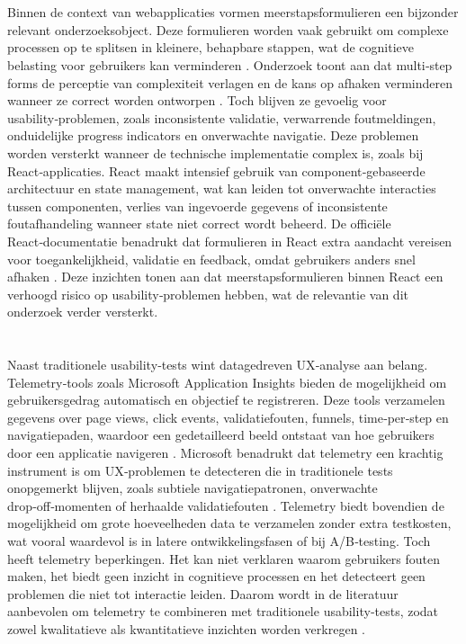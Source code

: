 \section{} 
Binnen de context van webapplicaties vormen meerstapsformulieren een bijzonder relevant onderzoeksobject. Deze formulieren worden vaak gebruikt om complexe processen op te splitsen in kleinere, behapbare stappen, wat de cognitieve belasting voor gebruikers kan verminderen \autocite{Sweller2011}. Onderzoek toont aan dat multi‑step forms de perceptie van complexiteit verlagen en de kans op afhaken verminderen wanneer ze correct worden ontworpen \autocite{BargasAvila2019}. Toch blijven ze gevoelig voor usability‑problemen, zoals inconsistente validatie, verwarrende foutmeldingen, onduidelijke progress indicators en onverwachte navigatie. Deze problemen worden versterkt wanneer de technische implementatie complex is, zoals bij React‑applicaties. React maakt intensief gebruik van component‑gebaseerde architectuur en state management, wat kan leiden tot onverwachte interacties tussen componenten, verlies van ingevoerde gegevens of inconsistente foutafhandeling wanneer state niet correct wordt beheerd. De officiële React‑documentatie benadrukt dat formulieren in React extra aandacht vereisen voor toegankelijkheid, validatie en feedback, omdat gebruikers anders snel afhaken \autocite{ReactForms2024}. Deze inzichten tonen aan dat meerstapsformulieren binnen React een verhoogd risico op usability‑problemen hebben, wat de relevantie van dit onderzoek verder versterkt.

\section{} 
Naast traditionele usability‑tests wint datagedreven UX‑analyse aan belang. Telemetry‑tools zoals Microsoft Application Insights bieden de mogelijkheid om gebruikersgedrag automatisch en objectief te registreren. Deze tools verzamelen gegevens over page views, click events, validatiefouten, funnels, time‑per‑step en navigatiepaden, waardoor een gedetailleerd beeld ontstaat van hoe gebruikers door een applicatie navigeren \autocite{MicrosoftAI}. Microsoft benadrukt dat telemetry een krachtig instrument is om UX‑problemen te detecteren die in traditionele tests onopgemerkt blijven, zoals subtiele navigatiepatronen, onverwachte drop‑off‑momenten of herhaalde validatiefouten \autocite{TelemetryUX2023}. Telemetry biedt bovendien de mogelijkheid om grote hoeveelheden data te verzamelen zonder extra testkosten, wat vooral waardevol is in latere ontwikkelingsfasen of bij A/B‑testing. Toch heeft telemetry beperkingen. Het kan niet verklaren waarom gebruikers fouten maken, het biedt geen inzicht in cognitieve processen en het detecteert geen problemen die niet tot interactie leiden. Daarom wordt in de literatuur aanbevolen om telemetry te combineren met traditionele usability‑tests, zodat zowel kwalitatieve als kwantitatieve inzichten worden verkregen \autocite{TelemetryUX2023}.

